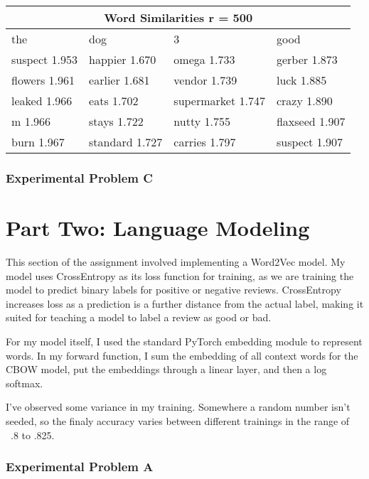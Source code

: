 \begin{tabular}{ |p{3cm}|p{3cm}|p{4cm}|p{3cm}|  }
    \hline
    \multicolumn{4}{|c|}{Word Similarities r = 500}                     \\
    \hline
    the           & dog            & 3                 & good           \\
    \hline
    suspect 1.953 & happier 1.670  & omega 1.733       & gerber 1.873   \\
    flowers 1.961 & earlier 1.681  & vendor 1.739      & luck 1.885     \\
    leaked 1.966  & eats 1.702     & supermarket 1.747 & crazy 1.890    \\
    m 1.966       & stays 1.722    & nutty 1.755       & flaxseed 1.907 \\
    burn 1.967    & standard 1.727 & carries 1.797     & suspect 1.907  \\
    \hline
\end{tabular}

\subsection*{Experimental Problem C}

\chapter*{Part Two: Language Modeling}

This section of the assignment involved implementing a Word2Vec model. My model uses CrossEntropy as its loss function for training, as we are training the model to predict binary labels for positive or negative reviews. CrossEntropy increases loss as a prediction is a further distance from the actual label, making it suited for teaching a model to label a review as good or bad.

For my model itself, I used the standard PyTorch embedding module to represent words. In my forward function, I sum the embedding of all context words for the CBOW model, put the embeddings through a linear layer, and then a log softmax.

I've observed some variance in my training. Somewhere a random number isn't seeded, so the finaly accuracy varies between different trainings in the range of ~.8 to .825.

\subsection*{Experimental Problem A}

